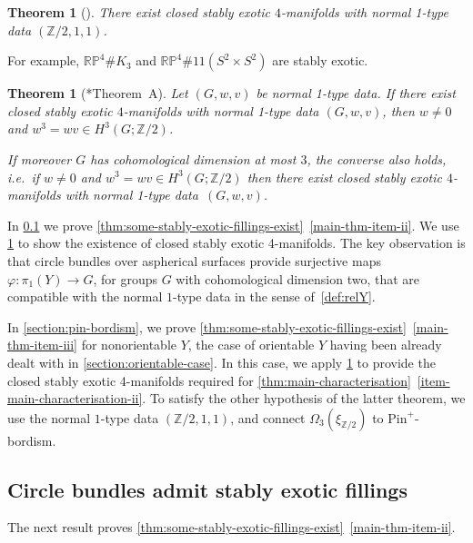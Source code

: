 \documentclass[a4paper, reqno]{amsart}
\newtheorem{theorem}[proposition]{Theorem}
\theoremstyle{definition}
\theoremstyle{remark}
\newcommand{\Z}{\mathbb{Z}}
\newcommand{\pinplus}{{\mathrm{Pin}^+}\!}
\newcommand{\RP}{\mathbb{RP}}
\begin{document}
\begin{theorem}[\cite{Kreck84}]\label{thm:kreck-Z-2-1-1-has-closed-stable-exotica}
There exist closed stably exotic $4$-manifolds with normal 1-type data $(\Z/2,1,1)$.    
\end{theorem}

For example, $\RP^4 \# K_3$ and $\RP^4 \# 11(S^2 \times S^2)$ are stably exotic. 

\begin{theorem}[\cite{Kasprowski-Powell}*{Theorem~A}]
\label{thm:stably-exotic-dim3}
    Let $(G,w,v)$ be normal 1-type data. If there exist closed stably exotic $4$-manifolds with normal 1-type data $(G,w,v)$, then $w\neq 0$ and $w^3=wv\in H^3(G;\Z/2)$. 
    
    If moreover $G$ has cohomological dimension at most $3$, the converse also holds, i.e.\ if $w \neq 0$ and $w^3 =wv \in H^3(G;\Z/2)$ then there exist closed stably exotic $4$-manifolds with normal 1-type data~$(G,w,v)$.
\end{theorem}

In \cref{section:circle-bundles} we prove \cref{thm:some-stably-exotic-fillings-exist}~\eqref{main-thm-item-ii}. We use \cref{thm:stably-exotic-dim3} to show the existence of closed stably exotic 4-manifolds. The key observation is that circle bundles over aspherical surfaces provide surjective maps $\varphi\colon \pi_1(Y)\to G$, for groups $G$ with cohomological dimension two, that are compatible with the normal $1$-type data in the sense of~\cref{def:relY}.

In \cref{section:pin-bordism}, we prove \cref{thm:some-stably-exotic-fillings-exist}~\eqref{main-thm-item-iii} for nonorientable $Y$, the case of orientable $Y$ having been already dealt with in \cref{section:orientable-case}.
In this case, we apply \cref{thm:kreck-Z-2-1-1-has-closed-stable-exotica} to provide the closed stably exotic 4-manifolds required for \cref{thm:main-characterisation}~\eqref{item-main-characterisation-ii}. To satisfy the other hypothesis of the latter theorem, we use the normal $1$-type data $(\Z/2,1,1)$, and connect $\Omega_3(\xi_{\Z/2})$ to $\pinplus$-bordism. 

\subsection{Circle bundles admit stably exotic fillings}\label{section:circle-bundles}

The next result proves \cref{thm:some-stably-exotic-fillings-exist}~\eqref{main-thm-item-ii}.
\end{document}
